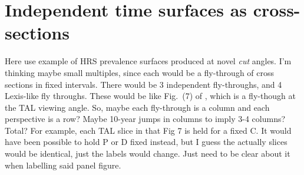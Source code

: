 \documentclass{bmcart}
\begin{document}
\section*{Independent time surfaces as cross-sections}
Here use example of HRS prevalence surfaces produced at novel \emph{cut} angles. I'm thinking maybe small multiples, since each would be a fly-through of cross sections in fixed intervals. There would be 3 independent fly-throughs, and 4 Lexis-like fly throughs. These would be  like Fig.~(7) of \cite{riffe2017demographictime}, which is a fly-though at the TAL viewing angle. So, maybe each fly-through is a column and each perspective is a row? Maybe 10-year jumps in columns to imply 3-4 columns? Total? For example, each TAL slice in that Fig 7 is held for a fixed C. It would have been possible to hold P or D fixed instead, but I guess the actually slices would be identical, just the labels would change. Just need to be clear about it when labelling said panel figure.


\end{document}
